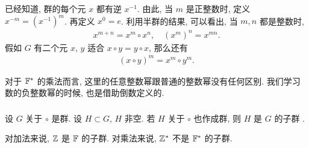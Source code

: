 \begin{definition}
    已经知道, 群的每个元 $x$ 都有逆 $x^{-1}$. 由此, 当 $m$ 是正整数时, 定义 $x^{-m} = (x^{-1})^m$. 再定义 $x^0 = e$. 利用半群的结果, 可以看出, 当 $m,n$ 都是整数时,
    \begin{align*}
        x^{m+n} = x^m \circ x^n, \quad (x^m)^n = x^{mn}.
    \end{align*}
    假如 $G$ 有二个元 $x$, $y$ 适合 $x \circ y = y \circ x$, 那么还有
    \begin{align*}
        (x \circ y)^m = x^m \circ y^m.
    \end{align*}
\end{definition}

\begin{example}
    对于 $\mathbb{F}^{\ast}$ 的乘法而言, 这里的任意整数幂跟普通的整数幂没有任何区别. 我们学习数的负整数幂的时候, 也是借助倒数定义的.
\end{example}

\subsubsection*{\Subgroups}

\begin{definition}
    设 $G$ 关于 $\circ$ 是群. 设 $H \subset G$, $H$ 非空. 若 $H$ 关于 $\circ$ 也作成群, 则 $H$ 是 $G$ 的子群 .
\end{definition}

\begin{example}
    对加法来说, $\mathbb{Z}$ 是 $\mathbb{F}$ 的子群. 对乘法来说, $\mathbb{Z}^{\ast}$ 不是 $\mathbb{F}^{\ast}$ 的子群.
\end{example}

